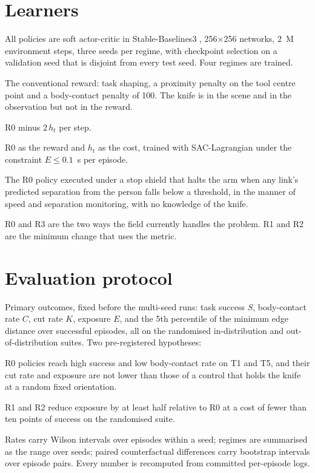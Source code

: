\documentclass[11pt,letterpaper]{article}
\begin{document}
\section{Learners}
\label{sec:learners}
All policies are soft actor-critic \cite{haarnoja2018sac} in Stable-Baselines3 \cite{raffin2021sb3}, 256$\times$256 networks, 2~M environment steps, three seeds per regime, with checkpoint selection on a validation seed that is disjoint from every test seed. Four regimes are trained.
\begin{description}[leftmargin=1.5em]
\item[R0 Body reward.] The conventional reward: task shaping, a proximity penalty on the tool centre point and a body-contact penalty of 100. The knife is in the scene and in the observation but not in the reward.
\item[R1 Hazard-shaped.] R0 minus $2\,h_t$ per step.
\item[R2 Constrained.] R0 as the reward and $h_t$ as the cost, trained with SAC-Lagrangian \cite{ji2024omnisafe} under the constraint $E \le 0.1$~s per episode.
\item[R3 Body shield.] The R0 policy executed under a stop shield that halts the arm when any link's predicted separation from the person falls below a threshold, in the manner of speed and separation monitoring, with no knowledge of the knife.
\end{description}
R0 and R3 are the two ways the field currently handles the problem. R1 and R2 are the minimum change that uses the metric.

\section{Evaluation protocol}
Primary outcomes, fixed before the multi-seed runs: task success $S$, body-contact rate $C$, cut rate $K$, exposure $E$, and the 5th percentile of the minimum edge distance over successful episodes, all on the randomised in-distribution and out-of-distribution suites. Two pre-registered hypotheses:
\begin{description}[leftmargin=1.5em]
\item[H1.] R0 policies reach high success and low body-contact rate on T1 and T5, and their cut rate and exposure are not lower than those of a control that holds the knife at a random fixed orientation.
\item[H2.] R1 and R2 reduce exposure by at least half relative to R0 at a cost of fewer than ten points of success on the randomised suite.
\end{description}
Rates carry Wilson intervals over episodes within a seed; regimes are summarised as the range over seeds; paired counterfactual differences carry bootstrap intervals over episode pairs. Every number is recomputed from committed per-episode logs.
\end{document}
